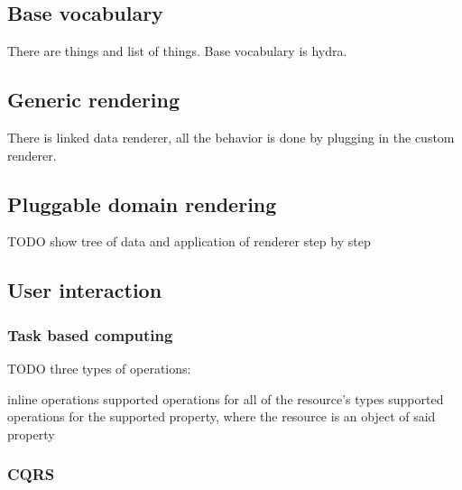 \subsection{Base vocabulary}\label{basevocab}

There are things and list of things. Base vocabulary is hydra.

\subsection{Generic rendering}\label{genericrendering}

There is linked data renderer, all the behavior is done by plugging in the custom renderer.

\subsection{Pluggable domain rendering}\label{domainrendering}

TODO show tree of data and application of renderer step by step

\subsection{User interaction}\label{interaction}

\subsubsection{Task based computing}\label{interaction}

TODO three types of operations:

inline operations
supported operations for all of the resource's types
supported operations for the supported property, where the resource is an object of said property

\subsubsection{CQRS}\label{interaction}
